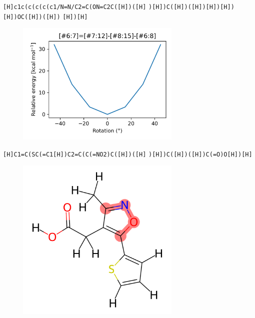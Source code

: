 \documentclass{beamer}
\begin{document}
\begin{frame}[fragile]
\verb|[H]c1c(c(c(c(c1/N=N/C2=C(ON=C2C([H])([H]|
\verb|)[H])C([H])([H])[H])[H])[H])OC([H])([H])|
\verb|[H])[H]|

\begin{figure}
    \includegraphics[width=0.7\textwidth,height=0.7\textheight,keepaspectratio]{plot06.png}
\end{figure}
\end{frame}
\begin{frame}[fragile]
\verb|[H]C1=C(SC(=C1[H])C2=C(C(=NO2)C([H])([H]|
\verb|)[H])C([H])([H])C(=O)O[H])[H]|

\begin{figure}
    \includegraphics[width=0.7\textwidth,height=0.7\textheight,keepaspectratio]{mol07.png}
\end{figure}
\end{frame}
\end{document}
